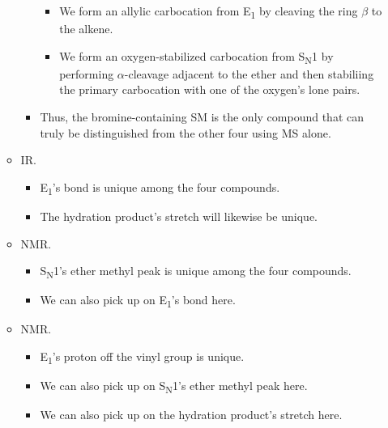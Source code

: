 \documentclass[../notes.tex]{subfiles}
\begin{document}
\begin{itemize}
\begin{itemize}
\begin{itemize}
            \begin{itemize}
                \item We form an allylic carbocation from E\textsubscript{1} by cleaving the ring $\beta$ to the alkene.
                \item We form an oxygen-stabilized carbocation from S\textsubscript{N}1 by performing $\alpha$-cleavage adjacent to the ether and then stabiliing the primary carbocation with one of the oxygen's lone pairs.
            \end{itemize}
            \item Thus, the bromine-containing SM is the only compound that can truly be distinguished from the other four using MS alone.
        \end{itemize}
        \item IR.
        \begin{itemize}
            \item E\textsubscript{1}'s  bond is unique among the four compounds.
            \item The hydration product's  stretch will likewise be unique.
        \end{itemize}
        \item {} NMR.
        \begin{itemize}
            \item S\textsubscript{N}1's ether methyl peak is unique among the four compounds.
            \item We can also pick up on E\textsubscript{1}'s  bond here.
        \end{itemize}
        \item {} NMR.
        \begin{itemize}
            \item E\textsubscript{1}'s proton off the vinyl group is unique.
            \item We can also pick up on S\textsubscript{N}1's ether methyl peak here.
            \item We can also pick up on the hydration product's  stretch here.
        \end{itemize}
    \end{itemize}
\end{itemize}
\end{document}
